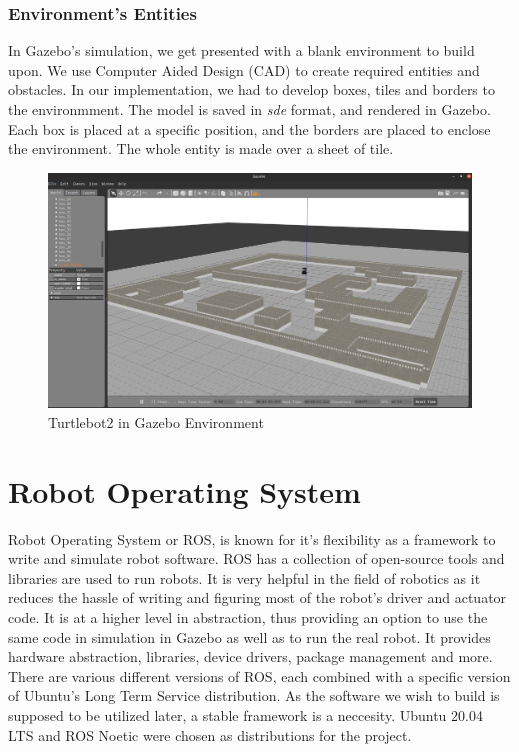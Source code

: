 \subsubsection{Environment's Entities}
In Gazebo's simulation, we get presented with a blank environment to build upon. We use Computer Aided Design (CAD) to create required entities and obstacles. In our implementation,
we had to develop boxes, tiles and borders to the environmment. The model is saved in \textit{sde} format, and rendered in Gazebo. Each box is placed at a specific position, and the borders are placed
to enclose the environment. The whole entity is made over a sheet of tile. 
\begin{figure}[th]
    \centering
    \includegraphics[width=\textwidth]{Figures/gazebo-image.png}
    \decoRule
    \caption[]{Turtlebot2 in Gazebo Environment}
    \label{fig:GazeboTurtlebot2}
\end{figure}

\section{Robot Operating System}
Robot Operating System or ROS, is known for it's flexibility as a framework to write and simulate robot software. ROS has a collection of open-source tools and libraries are used to run robots. It is
very helpful in the field of robotics as it reduces the hassle of writing and figuring most of the robot's driver and actuator code. It is at a higher level in abstraction, thus providing an option to use the same
code in simulation in Gazebo as well as to run the real robot. It provides hardware abstraction, libraries, device drivers, package management and more. 
There are various different versions of ROS, each combined with a specific version of Ubuntu's Long Term Service distribution. As the software we wish to build is supposed to be utilized later, a stable framework is a neccesity. Ubuntu 20.04 LTS and 
ROS Noetic were chosen as distributions for the project.

